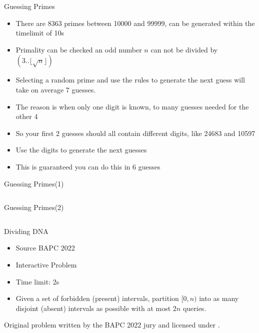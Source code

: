 \documentclass[11pt,pdf, aspectratio=169]{beamer}
\begin{document}
  \begin{frame}{Guessing Primes}
    \begin{itemize}
      \item There are 8363 primes between 10000 and 99999, can be generated within the timelimit of 10s
      \item Primality can be checked an odd number $n$ can not be divided by $(3..\lfloor\sqrt{n}\rfloor)$
      \item Selecting a random prime and use the rules to generate the next guess will take on average 7 guesses.
      \item The reason is when only one digit is known, to many guesses needed for the other 4
      \item So your first 2 guesses should all contain different digits, like 24683 and 10597
      \item Use the digits to generate the next guesses
      \item This is guaranteed you can do this in 6 guesses
    \end{itemize}
  \end{frame}
  \begin{frame}[containsverbatim]{Guessing Primes(1)}
    \inputminted[fontsize=\tiny]{python}{code/session-4/dapc-g-1.py}
  \end{frame}
  \begin{frame}[containsverbatim]{Guessing Primes(2)}
    \inputminted[fontsize=\tiny]{python}{code/session-4/dapc-g-2.py}
  \end{frame}
  \begin{frame}{Dividing DNA}
    \begin{itemize}
      \item Source BAPC 2022
      \item Interactive Problem
      \item Time limit: 2s
      \item  Given a set of forbidden (present) intervals, partition $[0,n)$ into as many disjoint (absent) intervals as possible with at most $2n$ queries.

    \end{itemize}
    Original problem written by the BAPC 2022 jury and licensed under \doclicenseLongNameRef.

    \doclicenseImage
  \end{frame}
\end{document}
